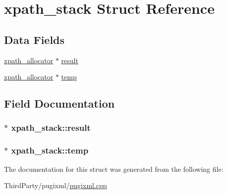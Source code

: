 \hypertarget{structxpath__stack}{\section{xpath\-\_\-stack Struct Reference}
\label{structxpath__stack}
}
\subsection*{Data Fields}
\begin{DoxyCompactItemize}
\item 
\hyperlink{classxpath__allocator}{xpath\-\_\-allocator} $\ast$ \hyperlink{structxpath__stack_adce164b779cbb3d1bc093a772067ea7e}{result}
\item 
\hyperlink{classxpath__allocator}{xpath\-\_\-allocator} $\ast$ \hyperlink{structxpath__stack_a48edd585dfb910c6c016559f07fea0d8}{temp}
\end{DoxyCompactItemize}


\subsection{Field Documentation}
\hypertarget{structxpath__stack_adce164b779cbb3d1bc093a772067ea7e}{
\subsubsection[{result}]{$\ast$ xpath\-\_\-stack\-::result}}\label{structxpath__stack_adce164b779cbb3d1bc093a772067ea7e}
\hypertarget{structxpath__stack_a48edd585dfb910c6c016559f07fea0d8}{
\subsubsection[{temp}]{$\ast$ xpath\-\_\-stack\-::temp}}\label{structxpath__stack_a48edd585dfb910c6c016559f07fea0d8}


The documentation for this struct was generated from the following file\-:\begin{DoxyCompactItemize}
\item 
Third\-Party/pugixml/\hyperlink{pugixml_8cpp}{pugixml.\-cpp}\end{DoxyCompactItemize}
